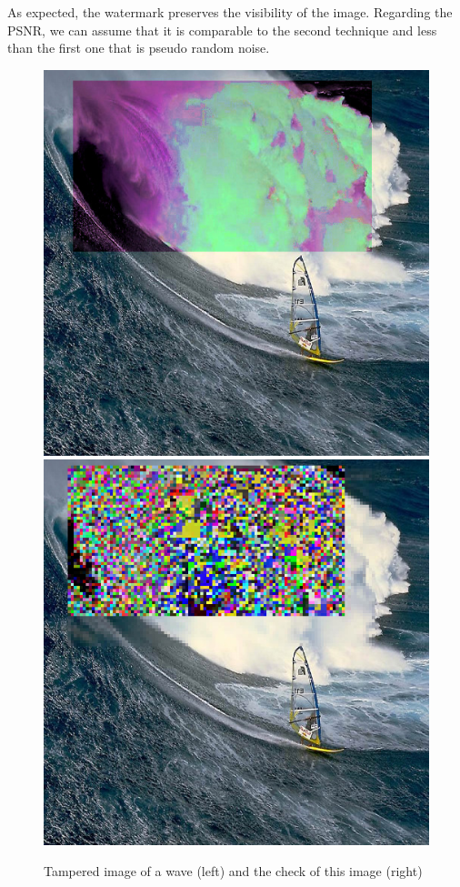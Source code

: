 \documentclass[11pt, oneside]{article}   	%
\begin{document}
			\newline
			As expected, the watermark preserves the visibility of the image. Regarding the PSNR, we can assume that it is comparable to the second technique and less than the first one that is pseudo random noise.
			\begin{figure}[h!]
			\begin{center}
				\includegraphics[scale=0.34]{images_png/image10.jpg}
				\includegraphics[scale=0.34]{images_png/image11.jpg}
			\end{center}
			\caption{Tampered image of a wave (left) and the check of this image (right)}
			\end{figure}
			\newpage
\end{document}

